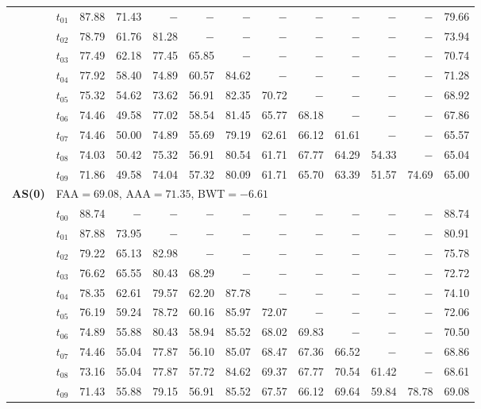 \begin{table}[ht]
\begin{tabular}{@{}l l r r r r r r r r r r r@{}}
 & $t_{01}$ & 87.88 & 71.43 & $-$ & $-$ & $-$ & $-$ & $-$ & $-$ & $-$ & $-$ & 79.66 \\
 & $t_{02}$ & 78.79 & 61.76 & 81.28 & $-$ & $-$ & $-$ & $-$ & $-$ & $-$ & $-$ & 73.94 \\
 & $t_{03}$ & 77.49 & 62.18 & 77.45 & 65.85 & $-$ & $-$ & $-$ & $-$ & $-$ & $-$ & 70.74 \\
 & $t_{04}$ & 77.92 & 58.40 & 74.89 & 60.57 & 84.62 & $-$ & $-$ & $-$ & $-$ & $-$ & 71.28 \\
 & $t_{05}$ & 75.32 & 54.62 & 73.62 & 56.91 & 82.35 & 70.72 & $-$ & $-$ & $-$ & $-$ & 68.92 \\
 & $t_{06}$ & 74.46 & 49.58 & 77.02 & 58.54 & 81.45 & 65.77 & 68.18 & $-$ & $-$ & $-$ & 67.86 \\
 & $t_{07}$ & 74.46 & 50.00 & 74.89 & 55.69 & 79.19 & 62.61 & 66.12 & 61.61 & $-$ & $-$ & 65.57 \\
 & $t_{08}$ & 74.03 & 50.42 & 75.32 & 56.91 & 80.54 & 61.71 & 67.77 & 64.29 & 54.33 & $-$ & 65.04 \\
 & $t_{09}$ & 71.86 & 49.58 & 74.04 & 57.32 & 80.09 & 61.71 & 65.70 & 63.39 & 51.57 & 74.69 & 65.00 \\
\midrule
\multirow{11}{*}{\textbf{AS(0)}} & \multicolumn{12}{l}{\quad\small FAA$=69.08$,\; AAA$=71.35$,\; BWT$=-6.61$} \\
 & $t_{00}$ & 88.74 & $-$ & $-$ & $-$ & $-$ & $-$ & $-$ & $-$ & $-$ & $-$ & 88.74 \\
 & $t_{01}$ & 87.88 & 73.95 & $-$ & $-$ & $-$ & $-$ & $-$ & $-$ & $-$ & $-$ & 80.91 \\
 & $t_{02}$ & 79.22 & 65.13 & 82.98 & $-$ & $-$ & $-$ & $-$ & $-$ & $-$ & $-$ & 75.78 \\
 & $t_{03}$ & 76.62 & 65.55 & 80.43 & 68.29 & $-$ & $-$ & $-$ & $-$ & $-$ & $-$ & 72.72 \\
 & $t_{04}$ & 78.35 & 62.61 & 79.57 & 62.20 & 87.78 & $-$ & $-$ & $-$ & $-$ & $-$ & 74.10 \\
 & $t_{05}$ & 76.19 & 59.24 & 78.72 & 60.16 & 85.97 & 72.07 & $-$ & $-$ & $-$ & $-$ & 72.06 \\
 & $t_{06}$ & 74.89 & 55.88 & 80.43 & 58.94 & 85.52 & 68.02 & 69.83 & $-$ & $-$ & $-$ & 70.50 \\
 & $t_{07}$ & 74.46 & 55.04 & 77.87 & 56.10 & 85.07 & 68.47 & 67.36 & 66.52 & $-$ & $-$ & 68.86 \\
 & $t_{08}$ & 73.16 & 55.04 & 77.87 & 57.72 & 84.62 & 69.37 & 67.77 & 70.54 & 61.42 & $-$ & 68.61 \\
 & $t_{09}$ & 71.43 & 55.88 & 79.15 & 56.91 & 85.52 & 67.57 & 66.12 & 69.64 & 59.84 & 78.78 & 69.08 \\

\end{tabular}
\end{table}
